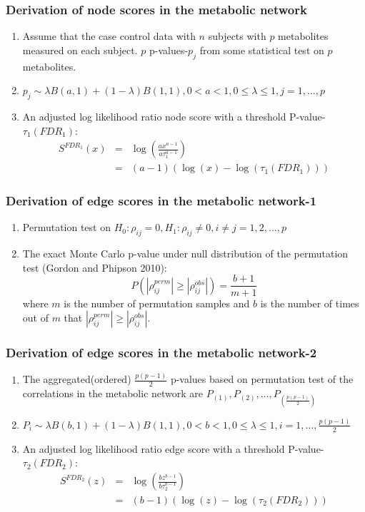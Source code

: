 \documentclass[10pt]{beamer}
\newcommand{\be}{\begin{equation}}
\newcommand{\ee}{\end{equation}}
\newcommand{\ba}{\begin{array}}
\newcommand{\ea}{\end{array}}
\begin{document}
\begin{frame}[fragile]
  \frametitle{Derivation of node scores in the metabolic network}
     \vspace{-2ex}
  \begin{enumerate}
  	\item<1-> 
  Assume that the case control data with $n$ subjects with $p$ metabolites measured on each subject. $p$ p-values-$p_j$ from some statistical test on $p$ metabolites.
   \vspace{1ex}
  	\item<2-> $p_j\sim \lambda B(a,1) +(1-\lambda)B(1,1),0<a<1,0\leq\lambda\leq 1,j=1,\ldots,p$
  	\vspace{1ex}
  		\item<3-> An adjusted log likelihood ratio node score with a threshold P-value-$\tau_1(FDR_1)$:\\
  		\be
  		\ba{rcl}
  		S^{FDR_1}(x)&=&\log(\frac{ax^{a-1}}{a\tau_{1}^{a-1}})\\
  		&=&(a-1)(\log(x)-\log(\tau_1(FDR_1)))
  		\ea
  		\ee
      \end{enumerate}
\end{frame}
  

  

\begin{frame}[fragile]
	\frametitle{Derivation of edge scores in the metabolic network-1}
	\begin{enumerate}
		\item<1-> Permutation test on $H_0:\rho_{ij}=0, H_1:\rho_{ij}\neq 0,i\neq j=1,2,\ldots,p$
		\vspace{2ex}
		\item<2-> The exact Monte Carlo p-value under null distribution of the permutation test (Gordon and Phipson 2010): \be
		P(|\rho_{ij}^{perm}|\geq |\rho_{ij}^{obs}|)=\frac{b+1}{m+1}
		\ee
		\vspace{1ex}
		where $m$ is the number of permutation samples and $b$ is the number of times out of $m$ that $|\rho_{ij}^{perm}|\geq |\rho_{ij}^{obs}|$.
	\end{enumerate}
\end{frame}

\begin{frame}[fragile]
	\frametitle{Derivation of edge scores in the metabolic network-2}
\begin{enumerate}
	\item<1-> The aggregated(ordered) $\frac{p(p-1)}{2}$ p-values based on permutation test of the correlations in the metabolic network are $P_{(1)},P_{(2)},\ldots,P_{(\frac{p(p-1)}{2})}$
		
\item<2-> $P_{i}\sim \lambda B(b,1) +(1-\lambda)B(1,1),0<b<1,0\leq\lambda\leq 1,i=1,\ldots,\frac{p(p-1)}{2}$
		\vspace{1ex}
\item<3-> An adjusted log likelihood ratio edge score with a threshold P-value-$\tau_2(FDR_2)$:\\
		\be
		\ba{rcl}
		S^{FDR_2}(z)&=&\log(\frac{bz^{b-1}}{b\tau_{2}^{b-1}})\\
		&=&(b-1)(\log(z)-\log(\tau_2(FDR_2)))
		\ea
		\ee
\end{enumerate}
\end{frame}
\end{document}
